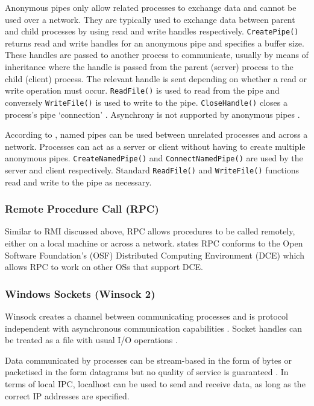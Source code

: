 \documentclass[12pt,a4paper,oneside]{article}
\def\code#1{\texttt{#1}}
\begin{document}
\begin{spacing}{1.4}
Anonymous pipes only allow related processes to exchange data and cannot be used over a network. They are typically used to exchange data between parent and child processes by using read and write handles respectively. \code{CreatePipe()} returns read and write handles for an anonymous pipe and specifies a buffer size. These handles are passed to another process to communicate, usually by means of inheritance where the handle is passed from the parent (server) process to the child (client) process. The relevant handle is sent depending on whether a read or write operation must occur. \code{ReadFile()} is used to read from the pipe and conversely \code{WriteFile()} is used to write to the pipe. \code{CloseHandle()} closes a process's pipe `connection' \citep{MSDN_API}. Asynchrony is not supported by anonymous pipes \citep{lewandowski1997interprocess}.

According to \cite{MSDN_API}, named pipes can be used between unrelated processes and across a network. Processes can act as a server or client without having to create multiple anonymous pipes. \code{CreateNamedPipe()} and \code{ConnectNamedPipe()} are used by the server and client respectively. Standard \code{ReadFile()} and \code{WriteFile()} functions read and write to the pipe as necessary. 

\subsubsection{Remote Procedure Call (RPC)}
Similar to RMI discussed above, RPC allows procedures to be called remotely, either on a local machine or across a network. \cite{MSDN_API} states RPC conforms to the Open Software Foundation's (OSF) Distributed Computing Environment (DCE) which allows RPC to work on other OSs that support DCE.

\subsubsection{Windows Sockets (Winsock 2)}
Winsock creates a channel between communicating processes and is protocol independent with asynchronous communication capabilities \citep{lewandowski1997interprocess}. Socket handles can be treated as a file with usual I/O operations \citep{MSDN_API}.

Data communicated by processes can be stream-based in the form of bytes or packetised in the form datagrams but no quality of service is guaranteed \citep{IPCWindowsLinkedInSlides}. In terms of local IPC, localhost can be used to send and receive data, as long as the correct IP addresses are specified.


\end{spacing}
\end{document}
